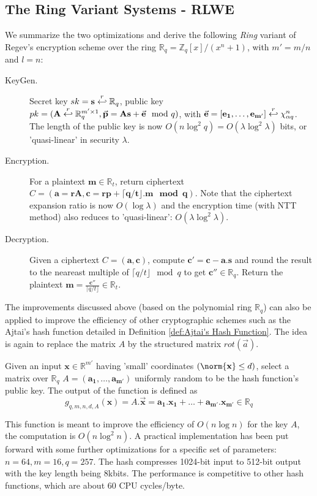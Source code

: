 \subsection{The Ring Variant Systems - RLWE}
\label{sec:RLWEPre}
We summarize the two optimizations and derive the following \emph{Ring} variant
of Regev's encryption scheme over the ring
$\mathbb{R}_q = \mathbb{Z}_q[x]/(x^n + 1)$, with $m' = m/n$ and $l = n$:
\begin{description}
\item[KeyGen.] Secret key $sk = \mathbf{s} \stackrel{r}{\hookleftarrow} \mathbb{R}_q$, public
  key
  $pk = (\mathbf{A} \stackrel{r}{\hookleftarrow} \mathbb{R}_q^{m' \times 1}, \vec{\mathbf{p}} =
  \mathbf{As} + \vec{\mathbf{e}} \mod q )$, with
  $\vec{\mathbf{e}} = [\mathbf{e_1, \dots, e_{m'}}] \stackrel{r}{\hookleftarrow} \chi_{\alpha
    q}^n$. The length of the public key is now
  $O(n \log^2 q) = O(\lambda \log^2 \lambda)$ bits, or 'quasi-linear' in
  security $\lambda$.
\item [Encryption.] For a plaintext $\mathbf{m} \in \mathbb{R}_t$, return
  ciphertext
  $C = (\mathbf{a = rA}, \mathbf{c = rp + \lceil q/t \rfloor. m \mod q })$. Note
  that the ciphertext expansion ratio is now $O(\log \lambda)$ and the
  encryption time (with NTT method) also reduces to 'quasi-linear':
  $O(\lambda \log^2 \lambda)$.
\item [Decryption.] Given a ciphertext $C = \mathbf{(a,c)}$, compute
  $\mathbf{c' = c - a.s}$ and round the result to the neareast multiple of
  $\lceil q/t \rfloor \mod q$ to get $\mathbf{c''} \in \mathbb{R}_q$. Return the
  plaintext
  $\mathbf{m} = \frac{\mathbf{c''}}{\lceil q/t \rfloor} \in \mathbb{R}_t$.
\end{description}
The improvements discussed above (based on the polynomial ring $\mathbb{R}_q$) can
also be applied to improve the efficiency of other cryptographic schemes such as
the Ajtai's hash function detailed in Definition \ref{def:Ajtai's Hash
  Function}. The idea is again to replace the matrix $A$ by the structured
matrix $rot(\vec{a})$.

\begin{definition}
   Given an input
  $\mathbf{x} \in \mathbb{R}^{m'}$ having 'small' coordinates
  $(\norm{\mathbf{x}} \leq d)$, select a matrix over $\mathbb{R}_q$
  $A=(\mathbf{a_1, \dots, a_{m'}})$ uniformly random to be the hash function's
  public key.  The output of the function is defined as
  \[
    g_{q,m,n,d,A}(\mathbf{x}) = A.\vec{\mathbf{x}} = \mathbf{a_1.x_1 + \dots +
      a_{m'}.x_{m'}} \in \mathbb{R}_q
  \]
  \label{def:AjtaiRing}
\end{definition}
This function is meant to improve the efficiency of $O(n\log n)$ for the key $A$,
the computation is $O(n\log^2 n)$. A practical implementation has been put forward
\cite{lyubashevsky2008swifft} with some further optimizations for a specific set
of parameters: $n = 64, m = 16, q = 257$. The hash compresses 1024-bit input to
512-bit output with the key length being 8kbits. The performance is competitive to
other hash functions, which are about 60 CPU cycles/byte.

